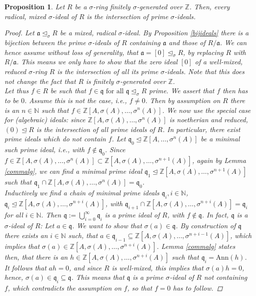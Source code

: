 \documentclass{article}
\def\N{\mathbb{N}}
\def\Z{\mathbb{Z}}
\def\a{\mathfrak{a}}
\def\q{\mathfrak{q}}
\def\s{\sigma}
\def\si{\unlhd_{\sigma}}
\def\fa{\text{ for all }}
\newenvironment{bew}{\begin{proof}[Proof]}{\end{proof}}
\theoremstyle{plain}
\newtheorem{prop}[Satz]{Proposition}
\theoremstyle{definition}
\begin{document}
\begin{prop}\label{mixedintersectionprimesfinite}
Let $R$ be a $\s$-ring finitely $\s$-generated over $\Z$. Then, every radical, mixed $\s$-ideal of $R$ is the intersection of prime $\s$-ideals.
\begin{bew}
Let $\a \si R$ be a mixed, radical $\s$-ideal. By Proposition \ref{bijideals} there is a bijection between the prime $\s$-ideals of $R$ containing $\a$ and those of $R/\a$. We can hence assume without loss of generality, that $\a = [0] \si R$,
 by replacing $R$ with $R/\a$. This means we only have to show that the zero ideal $[0]$ of a well-mixed, reduced $\s$-ring $R$ is the intersection of all its prime $\s$-ideals. Note that this does not change the fact
that $R$ is finitely $\s$-generated over $\Z$. \\
Let thus $f \in R$ be such that $f \in \q \fa \q \si R$ prime. We assert that $f$ then has to be $0$. Assume this is not the case, i.e., $f \neq 0$. Then by assumption on $R$ there is an $n \in \N$ such that $f \in \Z[A,\s(A),\ldots,\s^n(A)]$.
We now use the special case for (algebraic) ideals: since $\Z[A,\s(A),\ldots,\s^n(A)]$ is noetherian and reduced, $(0) \unlhd R$ is the intersection of all prime ideals of $R$. In particular, there exist prime ideals which do not contain $f$.
Let $\q_0 \unlhd \Z[A,\ldots,\s^n(A)]$ be a minimal such prime ideal, i.e., with $f \notin \q_0$. Since $f \in \Z[A,\s(A),\ldots,\s^n(A)] \subset \Z[A,\s(A),\ldots,\s^{n+1}(A)]$, again by Lemma \ref{commalg}, we can find a minimal prime ideal $\q_1 \unlhd \Z[A,\s(A),\ldots,\s^{n+1}(A)]$
such that $\q_1 \cap \Z[A,\s(A),\ldots,\s^{n}(A)] = \q_0$. \\
 Inductively we find a chain of minimal prime ideals $\q_i, i \in \N$, $\q_i \unlhd \Z[A,\s(A),\ldots,\s^{n+i}(A)]$, with $\q_{i+1} \cap \Z[A,\s(A),\ldots,\s^{n+i}(A)] = \q_i$ for all $i \in \N$.
Then $\q := \bigcup_{i=0}^{\infty} \q_i$ is a prime ideal of $R$, with $f \notin \q$. In fact, $\q$ is a $\s$-ideal of $R$: Let $a \in \q$. We want to show that $\s(a) \in \q$. By construction of $\q$ there exists an $i \in \N$ such,
that $a \in \q_{i-1} \subseteq \Z[A,\s(A),\ldots,\s^{n+i-1}(A)]$, which implies that $\s(a) \in \Z[A,\s(A),\ldots,\s^{n+i}(A)]$. Lemma \ref{commalg} states then, that there is an $h \in \Z[A,\s(A),\ldots,\s^{n+i}(A)]$ such that $ \q_i = \text{Ann}(h)$.
It follows that $ah = 0$, and since $R$ is well-mixed, this implies that $\s(a)h = 0$, hence, $\s(a) \in \q_i \subseteq \q$. This means that $\q$ is a prime $\s$-ideal of $R$ not containing $f$, which contradicts the assumption on $f$, so that $f = 0$ has to follow.
\end{bew}
\end{prop}
\end{document}
